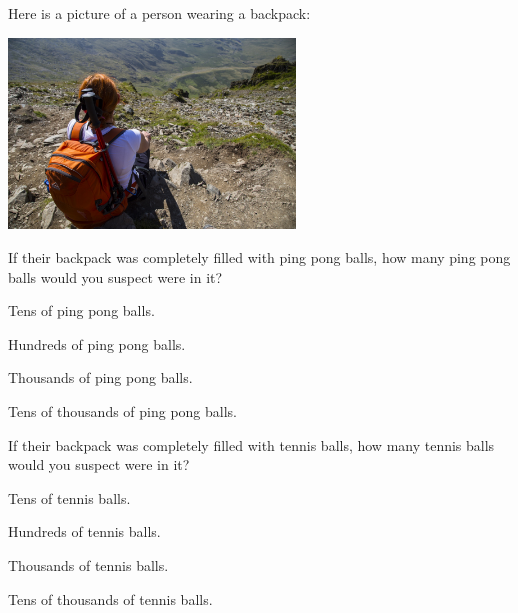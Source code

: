 \documentclass{ximera}
\author{Bart Snapp}
\begin{document}
\maketitle


\begin{exercise}
  Here is a picture of a person wearing a backpack:
  \begin{center}
    \includegraphics[width=3in]{backpack.jpg}
  \end{center}
  If their backpack was completely filled with ping pong balls, how
  many ping pong balls would you suspect were in it?
  \begin{enumerate}\begin{multicols}{2}
    \item Tens of ping pong balls.
    \item Hundreds of ping pong balls.
    \item Thousands of ping pong balls.
    \item Tens of thousands of ping pong balls. 
    \end{multicols}
  \end{enumerate}
\end{exercise}


\begin{exercise}
  If their backpack was completely filled with tennis balls, how many
  tennis balls would you suspect were in it?
  \begin{enumerate}\begin{multicols}{2}
    \item Tens of tennis balls.
    \item Hundreds of tennis balls.
    \item Thousands of tennis balls.
    \item Tens of thousands of tennis balls.
    \end{multicols}
  \end{enumerate}
\end{exercise}
  
\end{document}
